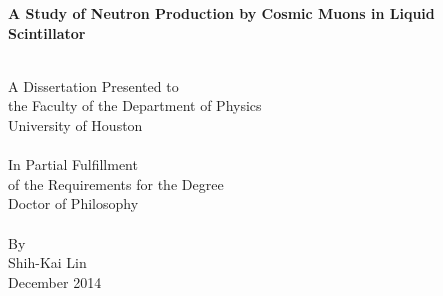 \begin{titlepage}
\begin{center}



\begin{description}
\bigskip
\bigskip
\bigskip
\bigskip
\bigskip
\end{description}

{ \huge \bfseries A Study of Neutron Production by Cosmic Muons in Liquid Scintillator \\[0.4cm] }

\HRule \\[1.0cm]

A Dissertation Presented to\\
the Faculty of the Department of Physics\\
University of Houston\\[1.0cm]

\HRule \\[1.0cm]

In Partial Fulfillment\\
of the Requirements for the Degree\\
Doctor of Philosophy\\[1.0cm]

\HRule \\[1.0cm]

By\\
Shih-Kai Lin\\
December 2014




\end{center}
\end{titlepage}